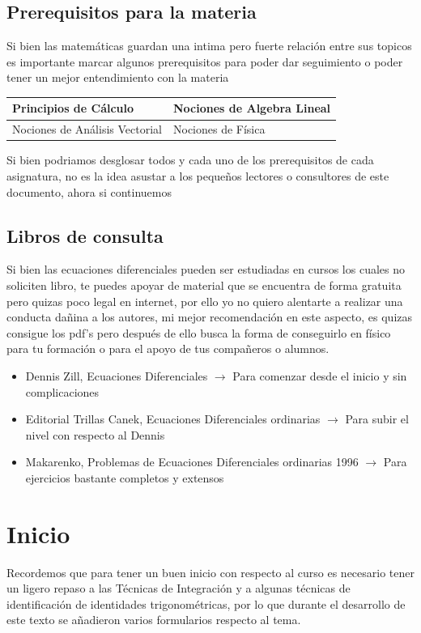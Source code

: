 \documentclass[10pt]{article}
\begin{document}
\subsection{Prerequisitos para la materia}
Si bien las matemáticas guardan una intima pero fuerte relación entre sus topicos es importante marcar algunos prerequisitos para poder dar seguimiento o poder tener un mejor entendimiento con la materia
\begin{center}
  \begin{tabular}{|p{5.5cm}|p{5.5cm}|}
    \hline
    Principios de Cálculo & Nociones de Algebra Lineal\\
    \hline
    Nociones de Análisis Vectorial & Nociones de Física\\
    \hline
  \end{tabular}
\end{center}
Si bien podriamos desglosar todos y cada uno de los prerequisitos de cada asignatura, no es la idea asustar a los pequeños lectores o consultores de este documento, ahora si continuemos

\subsection{Libros de consulta}
Si bien las ecuaciones diferenciales pueden ser estudiadas en cursos los cuales no soliciten libro, te puedes apoyar de material que se encuentra de forma gratuita pero quizas poco legal en internet, por ello yo no quiero alentarte a realizar una conducta dañina a los autores, mi mejor recomendación en este aspecto, es quizas consigue los pdf's pero después de ello busca la forma de conseguirlo en físico para tu formación o para el apoyo de tus compañeros o alumnos.
\begin{itemize}
  \item Dennis Zill, Ecuaciones Diferenciales $\rightarrow$ Para comenzar desde el inicio y sin complicaciones
  \item Editorial Trillas Canek, Ecuaciones Diferenciales ordinarias $\rightarrow$ Para subir el nivel con respecto al Dennis
  \item Makarenko, Problemas de Ecuaciones Diferenciales ordinarias 1996 $\rightarrow$ Para ejercicios bastante completos y extensos
\end{itemize}

\section{Inicio}
Recordemos que para tener un buen inicio con respecto al curso es necesario tener un ligero repaso a las Técnicas de Integración y a algunas técnicas de identificación de identidades trigonométricas, por lo que durante el desarrollo de este texto se añadieron varios formularios respecto al tema.
\end{document}
